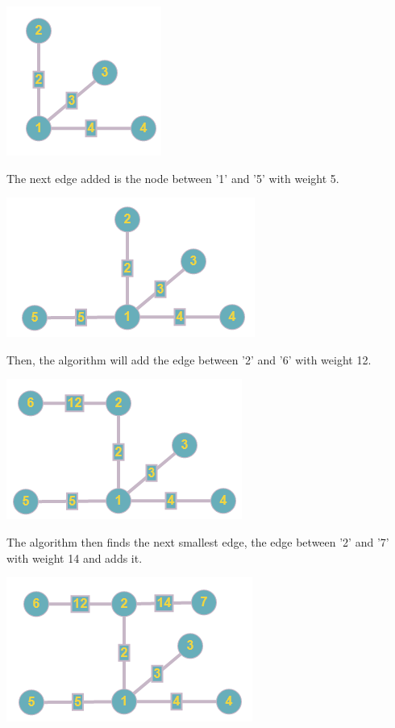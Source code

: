 \documentclass{article}
\begin{document}
\begin{center}
\includegraphics{b233}
\end{center}
The next edge added is the node between '1' and '5' with weight 5.
\newline
\begin{center}
\includegraphics{b234}
\end{center}
Then, the algorithm will add the edge between '2' and '6' with weight 12.
\newline
\begin{center}
\includegraphics{b235}
\end{center}
The algorithm then finds the next smallest edge, the edge between '2' and '7' with weight 14 and adds it.
\newline
\begin{center}
\includegraphics{b236}
\end{center}
\end{document}
